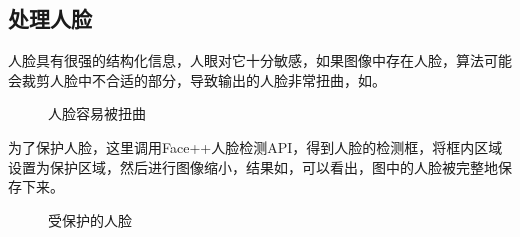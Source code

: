 \documentclass[11pt,a4paper]{article}
\begin{document}
\subsection{处理人脸}

人脸具有很强的结构化信息，人眼对它十分敏感，如果图像中存在人脸，算法可能会裁剪人脸中不合适的部分，导致输出的人脸非常扭曲，如。

\begin{figure}[H]
    \centering
    \caption{人脸容易被扭曲}
    \label{fig:face_unprotect}
\end{figure}

为了保护人脸，这里调用Face++人脸检测API，得到人脸的检测框，将框内区域设置为保护区域，然后进行图像缩小，结果如，可以看出，图中的人脸被完整地保存下来。

\begin{figure}[H]
    \centering
    \caption{受保护的人脸}
    \label{fig:face_protect}
\end{figure}
\end{document}
